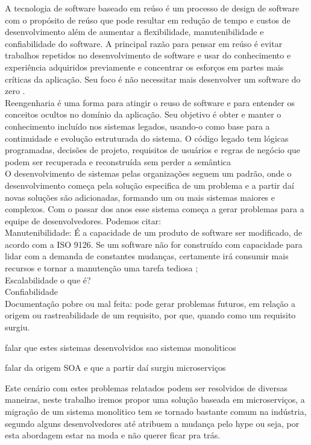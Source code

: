 \documentclass[12pt]{article}
\begin{document}
A tecnologia de software baseado em reúso é um processo de design de software com o propósito de reúso que pode resultar em redução de tempo e custos de desenvolvimento além de aumentar a flexibilidade, manutenibilidade e confiabilidade do software. A principal razão para pensar em reúso é evitar trabalhos repetidos no desenvolvimento de software e usar do conhecimento e experiência adquiridos previamente e concentrar os esforços em partes mais críticas da aplicação. Seu foco é não necessitar mais desenvolver um software do zero \cite{Yang}. 
\\
Reengenharia é uma forma para atingir o reuso de software e para entender os conceitos ocultos no domínio da aplicação. Seu objetivo é obter e manter o conhecimento incluído nos sistemas legados, usando-o como base para a continuidade e evolução estruturada do sistema. O código legado tem lógicas programadas, decisões de projeto, requisitos de usuários e regras de negócio que podem ser recuperada e reconstruída sem perder a semântica \cite{Garcia2004a}
\\
O desenvolvimento de sistemas pelas organizações seguem um padrão, onde o desenvolvimento começa pela solução especifica de um problema e a partir daí novas soluções são adicionadas, formando um ou mais sistemas maiores e complexos. Com o passar dos anos esse sistema começa a gerar problemas para a equipe de desenvolvedores. Podemos citar: 
\\Manutenibilidade: É a capacidade de um produto de software ser modificado, de acordo com a ISO 9126. Se um software não for construído com capacidade para lidar com a demanda de constantes mudanças, certamente irá consumir mais recursos e tornar a manutenção uma tarefa tediosa \cite{Velmourougan2014};
\\Escalabilidade o que é?
\\Confiabilidade
\\Documentação pobre ou mal feita: pode gerar problemas futuros, em relação a origem ou rastreabilidade de um requisito, por que, quando como um requisito surgiu.

falar que estes sistemas desenvolvidos sao sistemas monoliticos \cite{Dragoni2017}

falar da origem SOA e que a partir daí surgiu microserviços

Este cenário com estes problemas relatados podem ser resolvidos de diversas maneiras, neste trabalho iremos propor uma solução baseada em microserviços, a migração de um sistema monolitico tem se tornado bastante comum na indústria, segundo \cite{Carvalho2019} alguns desenvolvedores até atribuem a mudança pelo hype ou seja, por esta abordagem estar na moda e não querer ficar pra trás.
\end{document}
